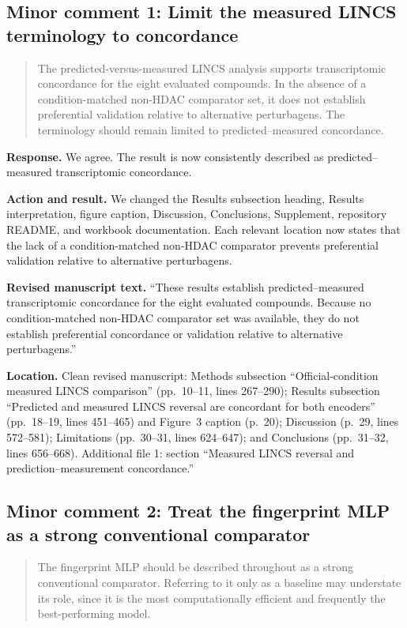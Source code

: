 \documentclass[10pt]{article}
\newenvironment{reviewcomment}{%
  \begin{quote}\small\itshape\color{black}
}{\end{quote}}
\newcommand{\Response}{\textbf{Response.} }
\newcommand{\Action}{\textbf{Action and result.} }
\newcommand{\RevisedText}{\textbf{Revised manuscript text.} }
\newcommand{\Location}{\textbf{Location.} }
\newcommand{\qtext}[1]{``#1''}
\begin{document}
\subsection*{Minor comment 1: Limit the measured LINCS terminology to concordance}

\begin{reviewcomment}
The predicted-versus-measured LINCS analysis supports transcriptomic concordance for the eight evaluated compounds. In the absence of a condition-matched non-HDAC comparator set, it does not establish preferential validation relative to alternative perturbagens. The terminology should remain limited to predicted--measured concordance.
\end{reviewcomment}

\Response We agree. The result is now consistently described as predicted--measured transcriptomic concordance.

\Action We changed the Results subsection heading, Results interpretation, figure caption, Discussion, Conclusions, Supplement, repository README, and workbook documentation. Each relevant location now states that the lack of a condition-matched non-HDAC comparator prevents preferential validation relative to alternative perturbagens.

\RevisedText \qtext{These results establish predicted--measured transcriptomic concordance for the eight evaluated compounds. Because no condition-matched non-HDAC comparator set was available, they do not establish preferential concordance or validation relative to alternative perturbagens.}

\Location Clean revised manuscript: Methods subsection ``Official-condition measured LINCS comparison'' (pp.~10--11, lines 267--290); Results subsection ``Predicted and measured LINCS reversal are concordant for both encoders'' (pp.~18--19, lines 451--465) and Figure~3 caption (p.~20); Discussion (p.~29, lines 572--581); Limitations (pp.~30--31, lines 624--647); and Conclusions (pp.~31--32, lines 656--668). Additional file 1: section ``Measured LINCS reversal and prediction--measurement concordance.''

\subsection*{Minor comment 2: Treat the fingerprint MLP as a strong conventional comparator}

\begin{reviewcomment}
The fingerprint MLP should be described throughout as a strong conventional comparator. Referring to it only as a baseline may understate its role, since it is the most computationally efficient and frequently the best-performing model.
\end{reviewcomment}
\end{document}
